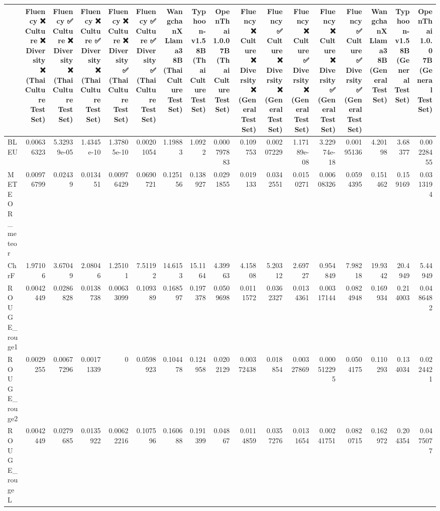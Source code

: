 \begin{tabular}{lrrrrrrrrrrrrrrrr}
\hline
                 &            Fluency ❌
 Culture ❌
 Diversity ❌
(Thai Culture Test Set) &             Fluency ✅
 Culture ❌
 Diversity ❌
(Thai Culture Test Set) &            Fluency ❌
 Culture ✅
 Diversity ❌
(Thai Culture Test Set) &             Fluency ❌
 Culture ❌
 Diversity ✅
(Thai Culture Test Set) &            Fluency ✅
 Culture ✅
 Diversity ✅
(Thai Culture Test Set) &           WangchanX Llama3 8B
(Thai Culture Test Set) &           Typhoon-v1.5 8B
(Thai Culture Test Set) &             OpenThai 1.0.0 7B
(Thai Culture Test Set) &            Fluency ❌
 Culture ❌
 Diversity ❌
(General Test Set) &            Fluency ✅
 Culture ❌
 Diversity ❌
(General Test Set) &             Fluency ❌
 Culture ✅
 Diversity ❌
(General Test Set) &             Fluency ❌
 Culture ❌
 Diversity ✅
(General Test Set) &            Fluency ✅
 Culture ✅
 Diversity ✅
(General Test Set) &           WangchanX Llama3 8B
(General Test Set) &           Typhoon-v1.5 8B
(General Test Set) &            OpenThai 1.0.0 7B
(General Test Set) \\
\hline
 BLEU            & 0.00636323 & 5.32939e-05 & 1.4345e-10 & 1.37805e-10 & 0.00201054 &  1.19883  &  1.0922   & 0.000797883 & 0.109753   & 0.00207229 & 1.17189e-08 & 3.22974e-18 & 0.00195136 &  4.20198  &  3.68377  & 0.00228455 \\
 METEOR_meteor   & 0.00976799 & 0.02439     & 0.013451   & 0.00976429  & 0.0690721  &  0.125156 &  0.138927 & 0.0291855   & 0.019133   & 0.0342551  & 0.0150271   & 0.00608326  & 0.0594395  &  0.151462 &  0.159169 & 0.0313194  \\
 ChrF            & 1.97106    & 3.67049     & 2.08046    & 1.25101     & 7.51192    & 14.6153   & 15.1164   & 4.39963     & 4.15808    & 5.20312    & 2.69727     & 0.954849    & 7.98218    & 19.9342   & 20.4949   & 5.44949    \\
 ROUGE_rouge1    & 0.0042449  & 0.0286828   & 0.0138738  & 0.00633099  & 0.109389   &  0.168597 &  0.197378 & 0.0509698   & 0.0111572  & 0.0362327  & 0.0134361   & 0.00317144  & 0.0824948  &  0.169934 &  0.214003 & 0.0486482  \\
 ROUGE_rouge2    & 0.0029255  & 0.00677296  & 0.00171339 & 0           & 0.0598923  &  0.104478 &  0.124958 & 0.0202129   & 0.00372438 & 0.018854   & 0.00327869  & 0.000512295 & 0.0504175  &  0.110293 &  0.134034 & 0.0224421  \\
 ROUGE_rougeL    & 0.0042449  & 0.0279685   & 0.0135922  & 0.00622216  & 0.107596   &  0.160688 &  0.191399 & 0.04867     & 0.0114859  & 0.0357276  & 0.0131654   & 0.00241751  & 0.0820715  &  0.162972 &  0.204354 & 0.0475077  \\

\end{tabular}
